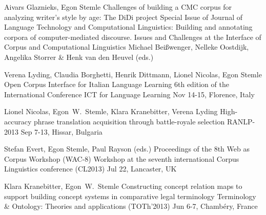 \documentclass[11pt,a4paper]{moderncv}
\begin{document}
        {Aivars Glaznieks, Egon Stemle}
        {\small Challenges of building a CMC corpus for analyzing writer's
        style by age: The DiDi project} 
        {\small Special Issue of Journal of Language Technology and
        Computational Linguistics: Building and annotating corpora of
        computer-mediated discourse. Issues and Challenges at the Interface of
        Corpus and Computational Linguistics}
        {\small Michael Beißwenger, Nelleke Oostdijk, Angelika Storrer \& Henk van den Heuvel (eds.)}
        {}

        {Verena Lyding, Claudia Borghetti, Henrik Dittmann, Lionel Nicolas, Egon Stemle}
        {\small Open Corpus Interface for Italian Language Learning}
        {\small 6th edition of the International Conference ICT for Language Learning}
        {\small Nov 14-15, Florence, Italy}
        {}

        {Lionel Nicolas, Egon~W.~Stemle, Klara Kranebitter, Verena Lyding}
        {\small High-accuracy phrase translation acquisition through
        battle-royale selection}
        {\small RANLP-2013}
        {\small Sep 7-13, Hissar, Bulgaria}
        {}

        {Stefan Evert, Egon Stemle, Paul Rayson (eds.)}
        {\small Proceedings of the 8th Web as Corpus Workshop (WAC-8)}
        {\small Workshop at the seventh international Corpus Linguistics conference (CL2013)}
        {\small Jul 22, Lancaster, UK}
        {}



        {Klara Kranebitter, Egon~W.~Stemle}
        {\small Constructing concept relation maps to support building concept
        systems in comparative legal terminology}
        {\small Terminology \& Ontology: Theories and applications (TOTh'2013)}
        {\small Jun 6-7, Chamb\'{e}ry, France}
        {}
\end{document}
